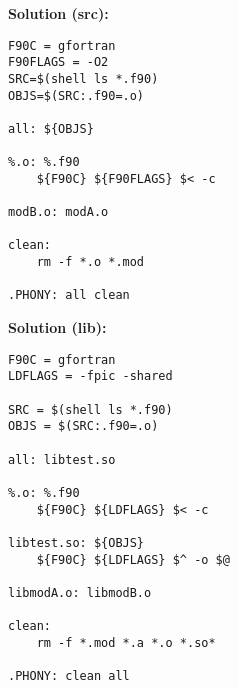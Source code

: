 \documentclass{article}
\begin{document}
{\bf Solution (src):}
\begin{lstlisting}
F90C = gfortran
F90FLAGS = -O2
SRC=$(shell ls *.f90)
OBJS=$(SRC:.f90=.o)

all: ${OBJS}

%.o: %.f90
	${F90C} ${F90FLAGS} $< -c

modB.o: modA.o

clean:
	rm -f *.o *.mod

.PHONY: all clean

\end{lstlisting}

{\bf Solution (lib):}
\begin{lstlisting}
F90C = gfortran
LDFLAGS = -fpic -shared

SRC = $(shell ls *.f90)
OBJS = $(SRC:.f90=.o)

all: libtest.so

%.o: %.f90
	${F90C} ${LDFLAGS} $< -c

libtest.so: ${OBJS}
	${F90C} ${LDFLAGS} $^ -o $@ 

libmodA.o: libmodB.o

clean:
	rm -f *.mod *.a *.o *.so*

.PHONY: clean all

\end{lstlisting}
\end{document}
